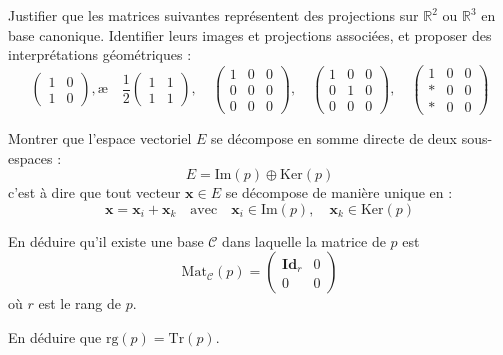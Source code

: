 \documentclass[10pt,a4paper]{article}
\newcommand{\Mat}[2]{\mathrm{Mat}_{#1}(#2)}
\begin{document}
\q Justifier que les matrices suivantes représentent des projections sur $\mathbb{R}^2$ ou
$\mathbb{R}^3$ en base canonique. Identifier leurs images et projections associées, et proposer des
interprétations géométriques :
\[
\begin{pmatrix}
1 & 0\\
1 & 0
\end{pmatrix},æ
\quad
\frac{1}{2}
\begin{pmatrix}
1 & 1\\
1 & 1
\end{pmatrix},
\quad
\begin{pmatrix}
1 & 0 & 0\\
0 & 0 & 0\\
0 & 0 & 0
\end{pmatrix},
\quad
\begin{pmatrix}
1 & 0 & 0\\
0 & 1 & 0\\
0 & 0 & 0
\end{pmatrix},
\quad
\begin{pmatrix}
1 & 0 & 0\\
* & 0 & 0\\
* & 0 & 0
\end{pmatrix}
\]

\q Montrer que l'espace vectoriel $E$ se décompose en somme directe de deux sous-espaces :
\[
E = \mathrm{Im}(p) \oplus \mathrm{Ker}(p)
\]
c'est à dire que tout vecteur $\mathbf{x} \in E$ se décompose de manière unique en :
\[
\mathbf{x} = \mathbf{x}_i + \mathbf{x}_k \quad \text{avec} \quad \mathbf{x}_i \in \mathrm{Im}(p), \quad \mathbf{x}_k \in \mathrm{Ker}(p)
\]

\q En déduire qu'il existe une base $\mathscr{C}$ dans laquelle la matrice de $p$ est
\[
\Mat{\mathscr{C}}{p} =
\begin{pmatrix}
\mathbf{Id}_r & 0\\
0 & 0
\end{pmatrix}
\]
où $r$ est le rang de $p$.

\q En déduire que $\mathrm{rg}(p) = \mathrm{Tr}(p)$.
\end{document}
